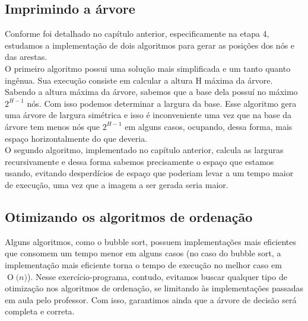 \documentclass[12pt,a4paper]{article}
\newcommand{\BigO}[1]{\ensuremath{\operatorname{O}\bigl(#1\bigr)}}
\begin{document}
	\subsection{Imprimindo a árvore}
	\indent Conforme foi detalhado no capítulo anterior, especificamente na etapa 4, estudamos a implementação de dois algoritmos para gerar as posições dos nós e das arestas.\\
	\indent O primeiro algoritmo possui uma solução mais simplificada e um tanto quanto ingênua. Sua execução consiste em calcular a altura H máxima da árvore. Sabendo a altura máxima da árvore, sabemos que a base dela possuí no máximo $2^{H-1}$ nós. Com isso podemos determinar a largura da base. Esse algoritmo gera uma árvore de largura simétrica e isso é inconveniente uma vez que na base da árvore tem menos nós que $2^{H-1}$ em alguns casos, ocupando, dessa forma, mais espaço horizontalmente do que deveria.\\
	\indent O segundo algoritmo, implementado no capítulo anterior, calcula as larguras recursivamente e dessa forma sabemos precisamente o espaço que estamos usando, evitando desperdícios de espaço que poderiam levar a um tempo maior de execução, uma vez que a imagem a ser gerada seria maior.



	\subsection{Otimizando os algoritmos de ordenação}
	\indent Alguns algoritmos, como o bubble sort, possuem implementações mais eficientes que consomem um tempo menor em alguns casos (no caso do bubble sort, a implementação mais eficiente torna o tempo de execução no melhor caso em \BigO{n}). Nesse exercício-programa, contudo, evitamos buscar qualquer tipo de otimização nos algoritmos de ordenação, se limitando às implementações passadas em aula pelo professor. Com isso, garantimos ainda que a árvore de decisão será completa e correta.
\end{document}
